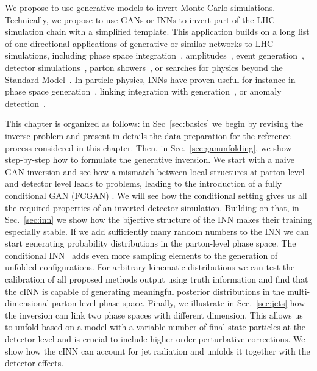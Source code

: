 We propose to use generative models to invert Monte Carlo simulations.
Technically, we propose to use GANs or INNs to invert part of the LHC simulation chain
with a simplified template.
This application builds on a long list of one-directional
applications of generative or similar networks to LHC simulations,
including phase space integration~\cite{maxim,bendavid},
amplitudes~\cite{Bishara:2019iwh,Badger:2020uow}, event
generation~\cite{dutch,gan_datasets,DijetGAN2,gan_phasespace,Alanazi:2020klf}, 
detector simulations~\cite{calogan1,calogan2,fast_accurate,aachen_wgan1,aachen_wgan2,ATLASShowerGAN,ATLASsimGAN,Belayneh:2019vyx,Buhmann:2020pmy},
parton showers~\cite{shower,by_example,monkshower,juniprshower}, or
searches for physics beyond the Standard Model~\cite{bsm_gan}.  
In particle physics, INNs have proven useful
for instance in phase space generation~\cite{Bothmann:2020ywa},
linking integration with generation~\cite{Gao:2020vdv,Gao:2020zvv}, or
anomaly detection~\cite{Nachman:2020lpy}.

This chapter is organized as follows:
in Sec~\ref{sec:basics} we begin by revising the inverse problem and present in details
the data preparation for the reference process considered in this chapter. 
Then, in Sec.~\ref{sec:ganunfolding}, we show step-by-step how to formulate
the generative inversion. We start with a naive GAN inversion and see 
how a mismatch between local structures at parton level and detector level 
leads to problems, leading to the introduction of a fully conditional GAN (FCGAN) .
We will see how the conditional setting gives us all the required properties of an
inverted detector simulation.
Building on that, in Sec.~\ref{sec:inn} we show how the bijective structure 
of the INN makes their training especially stable.  If we add sufficiently 
many random numbers to the INN we can start generating probability 
distributions in the parton-level phase space.  
The conditional INN~\cite{cinn,cinn2} adds even more
sampling elements to the generation of unfolded configurations.  
For arbitrary kinematic distributions we can test the calibration of all proposed
methods output using truth information and find that the cINN 
is capable of generating meaningful posterior distributions in
the multi-dimensional parton-level phase space.
Finally, we illustrate in Sec.~\ref{sec:jets} how the inversion can link two
phase spaces with different dimension. This allows us to unfold based
on a model with a variable number of final state particles at the
detector level and is crucial to include higher-order perturbative
corrections. 
We show how the cINN can account for jet radiation and
unfolds it together with the detector effects.

